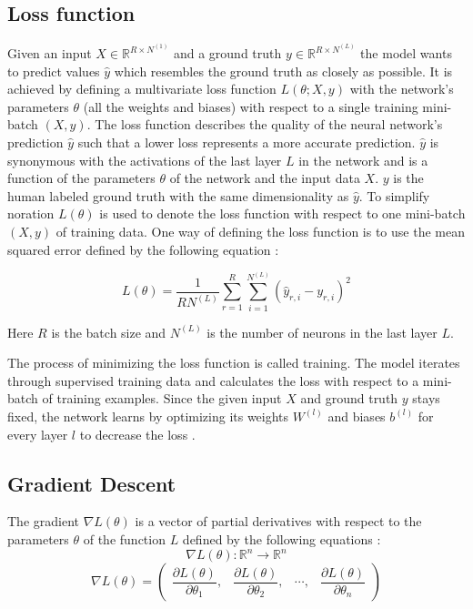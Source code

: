 \documentclass[a4paper, twoside]{article}
\newcommand*{\pd}[2]{\ensuremath{\dfrac{\partial #1}{\partial #2}}}
\begin{document}
\subsection{Loss function}
Given an input $X \in \mathbb{R}^{R \times N^{(1)}}$ and a ground truth $y \in \mathbb{R}^{R \times N^{(L)}}$ the model wants to predict values $\hat{y}$ which resembles the ground truth as closely as possible. It is achieved by defining a multivariate loss function $L(\theta; X, y)$  with the network's parameters $\theta$ (all the weights and biases) with respect to a single training mini-batch $(X, y)$. The loss function describes the quality of the neural network's prediction $\hat{y}$ such that a lower loss represents a more accurate prediction. $\hat{y}$ is synonymous with the activations of the last layer $L$ in the network and is a function of the parameters $\theta$ of the network and the input data $X$. $y$ is the human labeled ground truth with the same dimensionality as $\hat{y}$. To simplify noration $L(\theta)$ is used to denote the loss function with respect to one mini-batch $(X, y)$ of training data. One way of defining the loss function is to use the mean squared error defined by the following equation \cite{cs231n}:

\begin{equation}\label{MSE}
L(\theta) = \frac{1}{RN^{(L)}} \sum^{R}_{r=1} \sum^{N^{(L)}}_{i=1} (\hat{y}_{r,i}-y_{r,i})^2
\end{equation}

Here $R$ is the batch size and $N^{(L)}$ is the number of neurons in the last layer $L$.

The process of minimizing the loss function is called training. The model iterates through supervised training data and calculates the loss with respect to a mini-batch of training examples. Since the given input $X$ and ground truth $y$ stays fixed, the network learns by optimizing its weights $W^{(l)}$ and biases $b^{(l)}$ for every layer $l$ to decrease the loss \cite{cs231n} \cite{wikiStanford}.

\subsection{Gradient Descent}
The gradient $\nabla L(\theta)$ is a vector of partial derivatives with respect to the parameters $\theta$ of the function $L$ defined by the following equations \cite{gradient} \cite{convmath}:
\begin{equation}\label{EQgradientspace}
\nabla L(\theta) : \mathbb{R}^n \to \mathbb{R}^n
\end{equation}
\begin{equation}\label{EQgradientvector}
\nabla L(\theta) = 
	\begin{pmatrix} 
		\pd{L(\theta)}{\theta_{1}}, & 
		\pd{L(\theta)}{\theta_{2}}, &
		\cdots, &
		\pd{L(\theta)}{\theta_{n}}
		
		\end{pmatrix}
\end{equation}
\end{document}
